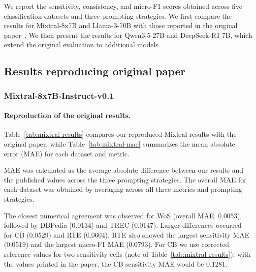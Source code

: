 \par\medskip

We report the sensitivity, consistency, and
micro-F1 scores obtained across five classification
datasets and three prompting strategies.
We first compare the results for Mixtral-8x7B
and Llama-3-70B with those reported in the
original paper~\cite{Errica:2025}.
We then present the results for Qwen3.5-27B
and DeepSeek-R1 7B, which extend the original
evaluation to additional models.


\subsection{Results reproducing original paper}

\subsubsection{Mixtral-8x7B-Instruct-v0.1}

\paragraph{Reproduction of the original results.}
\mbox{}\par

Table~\ref{tab:mixtral-results} compares our
reproduced Mixtral results with the original
paper, while Table~\ref{tab:mixtral-mae}
summarizes the mean absolute error (MAE)
for each dataset and metric.

\par\medskip

MAE was calculated as the average absolute
difference between our results and the published
values across the three prompting strategies.
The overall MAE for each dataset was obtained
by averaging across all three metrics and
prompting strategies.

\par\medskip

The closest numerical agreement was observed
for WoS (overall MAE: 0.0053), followed by
DBPedia (0.0134) and TREC (0.0147).
Larger differences occurred for CB (0.0529)
and RTE (0.0604). RTE also showed the largest
sensitivity MAE (0.0519) and the largest
micro-F1 MAE (0.0793). For CB we use corrected
reference values for two sensitivity cells
(note of Table~\ref{tab:mixtral-results}); with
the values printed in the paper, the CB
sensitivity MAE would be 0.1281.


